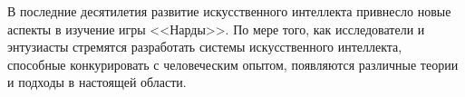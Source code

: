 В последние десятилетия развитие искусственного интеллекта привнесло новые аспекты в изучение игры <<Нарды>>. По мере того, как исследователи и энтузиасты стремятся разработать системы искусственного интеллекта, способные конкурировать с человеческим опытом, появляются различные теории и подходы в настоящей области.

